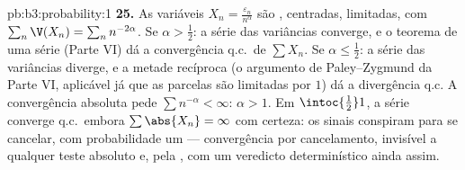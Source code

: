 \begin{solution}{pb:b3:probability:1}
\textbf{25.} As variáveis $X_n = \frac{\varepsilon_n}
{n^\alpha}$ são , centradas, limitadas, com
$\sum_n\V(X_n) = \sum_nn^{-2\alpha}$. Se $\alpha >
\frac12$: a série das variâncias converge, e o
teorema de uma série (Parte VI) dá a convergência q.c.\ de
$\sum X_n$. Se $\alpha \leq \frac12$: a série das variâncias
diverge, e a metade recíproca (o argumento de
Paley--Zygmund da Parte VI, aplicável já que as parcelas são
limitadas por $1$) dá a divergência q.c. A convergência
absoluta pede $\sum n^{-\alpha} < \infty$: $\alpha > 1$.
Em $\intoc{\frac12}1$, a série converge q.c.\ embora
$\sum\abs{X_n} = \infty$ com certeza: os sinais conspiram para
se cancelar, com probabilidade um --- convergência por
cancelamento, invisível a qualquer teste absoluto e, pela
, com um veredicto determinístico ainda assim.
\end{solution}
